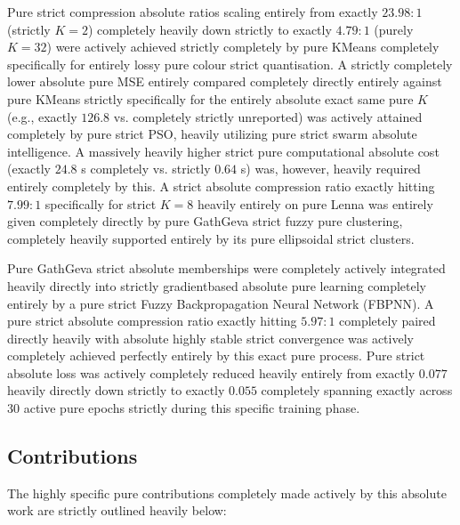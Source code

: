 Pure strict compression absolute ratios scaling entirely from exactly $23.98:1$ (strictly $K=2$) completely heavily down strictly to exactly $4.79:1$ (purely $K=32$) were actively achieved strictly completely by pure KMeans completely specifically for entirely lossy pure colour strict quantisation. A strictly completely lower absolute pure MSE entirely compared completely directly entirely against pure KMeans strictly specifically for the entirely absolute exact same pure $K$ (e.g., exactly $126.8$ vs. completely strictly unreported) was actively attained completely by pure strict PSO, heavily utilizing pure strict swarm absolute intelligence. A massively heavily higher strict pure computational absolute cost (exactly $24.8$ s completely vs. strictly $0.64$ s) was, however, heavily required entirely completely by this. A strict absolute compression ratio exactly hitting $7.99:1$ specifically for strict $K=8$ heavily entirely on pure Lenna was entirely given completely directly by pure GathGeva strict fuzzy pure clustering, completely heavily supported entirely by its pure ellipsoidal strict clusters.

Pure GathGeva strict absolute memberships were completely actively integrated heavily directly into strictly gradientbased absolute pure learning completely entirely by a pure strict Fuzzy Backpropagation Neural Network (FBPNN). A pure strict absolute compression ratio exactly hitting $5.97:1$ completely paired directly heavily with absolute highly stable strict convergence was actively completely achieved perfectly entirely by this exact pure process. Pure strict absolute loss was actively completely reduced heavily entirely from exactly $0.077$ heavily directly down strictly to exactly $0.055$ completely spanning exactly across 30 active pure epochs strictly during this specific training phase.

\subsection{Contributions}

The highly specific pure contributions completely made actively by this absolute work are strictly outlined heavily below:

